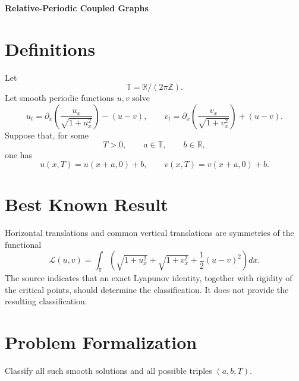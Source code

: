 \documentclass[10pt,a4paper]{article}
\theoremstyle{definition}
\begin{document}
\begin{center}
  {\Large\bfseries Relative-Periodic Coupled Graphs}
\end{center}

\section{Definitions}

Let
\[
  \mathbb T=\mathbb R/(2\pi\mathbb Z).
\]
Let smooth periodic functions $u,v$ solve
\begin{equation}
  u_t
  =
  \partial_x\left(\frac{u_x}{\sqrt{1+u_x^2}}\right)
  -(u-v),
  \qquad
  v_t
  =
  \partial_x\left(\frac{v_x}{\sqrt{1+v_x^2}}\right)
  +(u-v).
\end{equation}
Suppose that, for some
\begin{equation}
  T>0,
  \qquad
  a\in\mathbb T,
  \qquad
  b\in\mathbb R,
\end{equation}
one has
\begin{equation}
  u(x,T)=u(x+a,0)+b,
  \qquad
  v(x,T)=v(x+a,0)+b.
\end{equation}

\section{Best Known Result}

Horizontal translations and common vertical translations are symmetries of
the functional
\begin{equation}
  \mathcal L(u,v)
  =
  \int_{\mathbb T}
  \left(
    \sqrt{1+u_x^2}
    +\sqrt{1+v_x^2}
    +\frac{1}{2}(u-v)^2
  \right)dx.
\end{equation}
The source indicates that an exact Lyapunov identity, together with rigidity
of the critical points, should determine the classification. It does not
provide the resulting classification.

\section{Problem Formalization}


Classify all such smooth solutions and all possible triples $(a,b,T)$.
\end{document}
